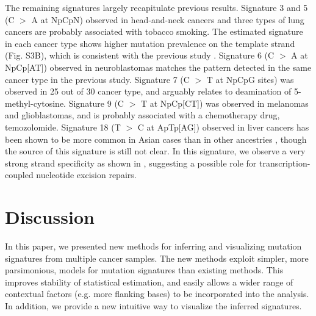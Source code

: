 \documentclass[10pt,letterpaper]{article}
\begin{document}
The remaining signatures largely recapitulate previous results.
Signature 3 and 5 (C $>$ A at NpCpN) observed in head-and-neck cancers and three types of lung cancers are probably associated with tobacco smoking.
The estimated signature in each cancer type shows higher mutation prevalence on the template strand (Fig. S3B), 
which is consistent with the previous study \cite{pmid12379884, pmid23318258}.
Signature 6 (C $>$ A at NpCp[AT]) observed in neuroblastomas matches the pattern detected in the same cancer type in the previous study.
Signature 7 (C $>$ T at NpCpG sites) was observed in 25 out of 30 cancer type, and arguably relates to deamination of 5-methyl-cytosine.
Signature 9 (C $>$ T at NpCp[CT]) was observed in melanomas and glioblastomas, and is probably associated with a chemotherapy drug, temozolomide.
Signature 18 (T $>$ C at ApTp[AG]) observed in liver cancers has been shown to be more common in Asian cases than in other ancestries \cite{pmid25362482}, 
though the source of this signature is still not clear. 
In this signature, we observe a very strong strand specificity as shown in \cite{pmid25362482, pmid23318258},
suggesting a possible role for transcription-coupled nucleotide excision repairs.
 



\section*{Discussion}

In this paper, we presented new methods for inferring and visualizing mutation signatures from multiple cancer samples.
The new methods exploit simpler, more parsimonious, models
for mutation signatures than existing methods.
This improves stability of statistical estimation, and easily allows
a wider range of contextual factors (e.g. more flanking bases) to be
incorporated into the analysis. In addition, we provide a new
intuitive way to visualize the inferred signatures.
\end{document}
